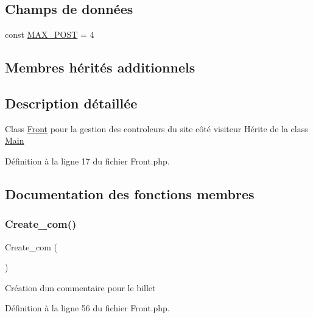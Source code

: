 \subsection*{Champs de données}
\begin{DoxyCompactItemize}
\item 
const \hyperlink{class_src_1_1_controllers_1_1_front_ae6f0a6c86ad9f61cbc99ad3c4180b481}{M\+A\+X\+\_\+\+P\+O\+ST} = 4
\end{DoxyCompactItemize}
\subsection*{Membres hérités additionnels}


\subsection{Description détaillée}
Class \hyperlink{class_src_1_1_controllers_1_1_front}{Front} pour la gestion des controleurs du site côté visiteur Hérite de la class \hyperlink{class_src_1_1_controllers_1_1_main}{Main} 

Définition à la ligne 17 du fichier Front.\+php.



\subsection{Documentation des fonctions membres}
\mbox{\label{class_src_1_1_controllers_1_1_front_aff5b608669ee776cd4c341238adddb7c}} 
\subsubsection{\texorpdfstring{Create\+\_\+com()}{Create\_com()}}
{\footnotesize\ttfamily Create\+\_\+com (\begin{DoxyParamCaption}{ }\end{DoxyParamCaption})}

Création d\textquotesingle{}un commentaire pour le billet 

Définition à la ligne 56 du fichier Front.\+php.

\mbox{\label{class_src_1_1_controllers_1_1_front_ac36db983080e1b0934908febca5de2d9}} 
